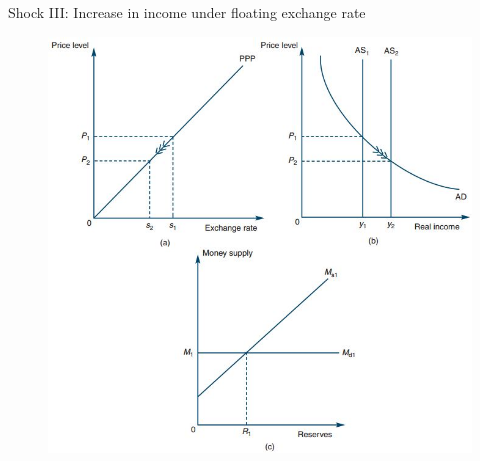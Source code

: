 \documentclass[10pt,hyperref={CJKbookmarks=true},xcolor=dvipsnames,aspectratio=169]{beamer}
\begin{document}
\begin{frame}{Shock III: Increase in income under floating exchange rate}


\begin{figure}


\includegraphics[scale=0.4]{fig/boptheory/lec08-23.JPG}

\end{figure}

\end{frame}
\end{document}
